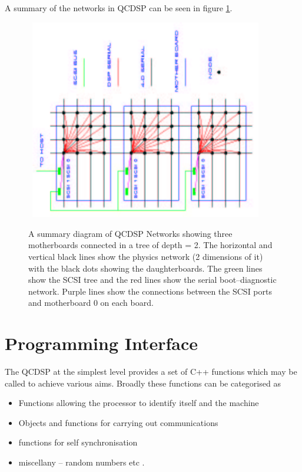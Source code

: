 A summary of the networks in QCDSP can be seen in figure \ref{f:networkSummary}.
\begin{figure}[ht]
\begin{center}
\leavevmode
\hbox{%
\includegraphics[width=4in]{networks_summary}
}
\end{center}
\caption{A summary diagram of QCDSP Networks showing three motherboards
connected in a tree of depth = 2. The horizontal and vertical
black lines show the physics network (2 dimensions of it) with the black
dots showing the daughterboards. The green lines show the SCSI tree and 
the red lines show the serial boot--diagnostic network. Purple lines 
show the connections between the SCSI ports and motherboard 0 on each 
board.}
\label{f:networkSummary}
\end{figure}

\section{Programming Interface}
The QCDSP at the simplest level provides a set of C++ functions
which may be called to achieve various aims. Broadly these functions
can be categorised as
\begin{itemize}
\item
Functions allowing the processor to identify itself and the machine
\item
Objects and functions for carrying out communications
\item
functions for self synchronisation
\item
miscellany -- random numbers etc .
\end{itemize}

